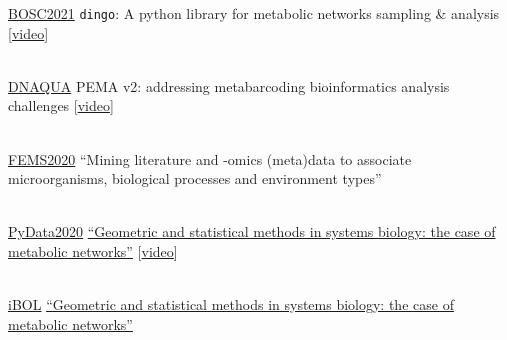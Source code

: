 \documentclass[
	a4paper,
]{fortysecondscv}
\begin{document}

\begin{cvtable}

    	{\href{https://www.open-bio.org/events/bosc-2021/}{BOSC2021}}
	    {\texttt{dingo}: A python library for metabolic networks sampling \& analysis [\href{https://www.youtube.com/watch?v=IyRD4N6iBu0&t=1s}{video}]
        }{}

    \\
    
    	{\href{https://symposium.inrae.fr/dnaqua-conference-evian2021/}{DNAQUA}}
	    {PEMA v2: addressing metabarcoding bioinformatics analysis challenges
        [\href{https://www.youtube.com/watch?v=kht_LKMmB6w}{video}]
        }{}
	    
	\\

    	{\href{https://fems2020belgrade.com/}{FEMS2020}}
	    {“Mining literature and -omics (meta)data to associate microorganisms, biological processes and environment types”}{}

    \\

    	{\href{https://pydata.org/global2020/}{PyData2020}}
	    {\href{https://www.youtube.com/watch?v=zg8KFZ_LbHM&t=1s}{“Geometric and statistical methods in systems biology: the case of metabolic networks”}
        [\href{https://www.youtube.com/watch?v=zg8KFZ_LbHM}{video}]
        }{}

    \\
    
    	{\href{http://dnabarcodes2019.org/}{iBOL}}
    	{\href{Geometric and statistical methods in systems biology the case of metabolic net}{“Geometric and statistical methods in systems biology: the case of metabolic networks”}}{}

\end{cvtable}
\end{document}
